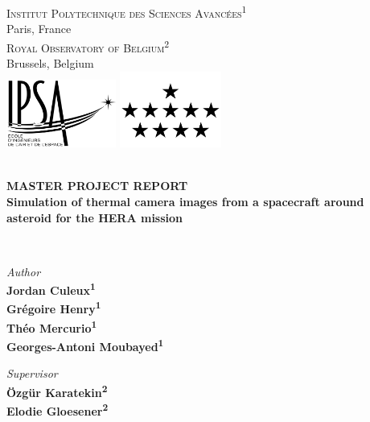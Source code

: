 \begin{titlepage}
    \vspace*{2cm}
    \centering
    \textsc{\large
    Institut Polytechnique des Sciences Avancées\textsuperscript{1}\\
    }
    Paris, France\\[0.5cm]
    \textsc{\large
    Royal Observatory of Belgium\textsuperscript{2}\\
    }
    Brussels, Belgium\\[0.5cm]
    \includegraphics[width=0.27\textwidth]{../rsc/ipsa.png}
    \hspace{1cm}
    \includegraphics[width=0.25\textwidth]{../rsc/rob.png}\\[1cm]

    \linespread{1}
    \HRule \\[0.3cm]
    {\Large\bfseries
    MASTER PROJECT REPORT\\
    Simulation of thermal camera images from a spacecraft around asteroid for the HERA mission
    \par}
    \vspace*{0.3cm}
    \HRule \\[2cm]

    \begin{minipage}[t]{0.4\textwidth}
        \begin{flushleft} \large
            \emph{Author}\\\bfseries
            Jordan Culeux\textsuperscript{1}\\
            Grégoire Henry\textsuperscript{1}\\
            Théo Mercurio\textsuperscript{1}\\
            Georges-Antoni Moubayed\textsuperscript{1}
        \end{flushleft}
    \end{minipage}
    \begin{minipage}[t]{0.4\textwidth}
        \begin{flushright} \large
            \emph{Supervisor}\\\bfseries
            Özgür Karatekin\textsuperscript{2}\\
            Elodie Gloesener\textsuperscript{2}
        \end{flushright}
    \end{minipage}


\end{titlepage}
